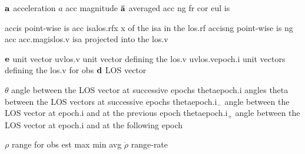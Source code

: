 \begin{acronym}[---------------]

					{${\bf a}$}													{acceleration}
			{$a$}																{\acl{acc} magnitude}
			{${\bf \bar a}$}										{averaged \acl{acc}}
					{ng}
					{fr}
					{cor}
					{eul}
					{is}

					{\acs{acc}\acs{is}}									{point-wise \acl{is} \acl{acc}}
				{\acs{isa}\acs{los.rf}\acs{x}}			{\acl{x} of the \acl{isa} in the \acl{los.rf}}
			{\acs{acc}\acs{is}\acs{ng}}					{point-wise \acl{is} \acl{ng} \acl{acc}}
			{\acs{acc.mag}\acs{is}\acs{los.v}}	{\acl{isa} projected into the \acl{los.v}}

					{${\mathsf {\bf e}}$}								{unit vector}
			{\acs{uv}\acs{los.v}}								{unit vector defining the \acl{los.v}}
		{\acs{uv}\acs{los.v}\acs{epoch.i}}	{unit vectors defining the \acl{los.v}}
			{for}
			{obs}
				{${\bf d}$}													{\ac{LOS} vector}

				{$\theta$}%
															{angle between the \ac{LOS} vector at successive epochs}
			{\acs{theta}\acs{epoch.i}}%
															{angles \acs{theta} between the \ac{LOS} vectors at successive epochs}
	{\acs{theta}\acs{epoch.i}$_{-}$}%
															{angle between the \ac{LOS} vector at \acl{epoch.i} and at the previous epoch}
	{\acs{theta}\acs{epoch.i}$_{+}$}%
															{angle between the \ac{LOS} vector at \acl{epoch.i} and at the following epoch}

				{$\rho$}			{range}
				{for}
				{obs}
				{est}
				{max}
				{min}
				{avg}
	{$\dot \rho$}	{range-rate}


\end{acronym}
